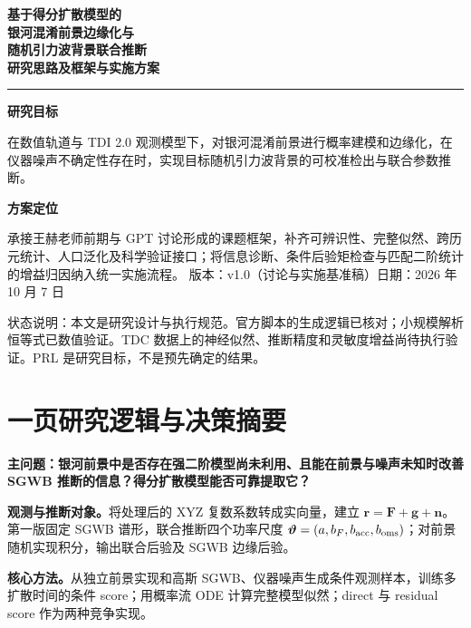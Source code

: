 \documentclass[UTF8,fontset=fandol,a4paper,11pt]{ctexart}
\numberwithin{equation}{section}
\newcommand{\btheta}{\boldsymbol\vartheta}
\newcommand{\br}{\boldsymbol r}
\newcommand{\bF}{\boldsymbol F}
\newcommand{\bn}{\boldsymbol n}
\newcommand{\bg}{\boldsymbol g}
\newcommand{\key}[1]{\par\smallskip\noindent\colorbox{pale}{\parbox{\dimexpr\linewidth-2\fboxsep\relax}{\textbf{#1}}}\par\smallskip}
\begin{document}
\begin{titlepage}
\vspace*{17mm}
\vspace{13mm}
\begin{center}
{\huge\bfseries 基于得分扩散模型的\\[6pt]银河混淆前景边缘化与\\[6pt]随机引力波背景联合推断\\[10pt]研究思路及框架与实施方案\par}
\end{center}
\vspace{12mm}
\noindent\rule{\linewidth}{0.7pt}
\vspace{6mm}
\noindent\textbf{研究目标}\par
在数值轨道与 TDI 2.0 观测模型下，对银河混淆前景进行概率建模和边缘化，在仪器噪声不确定性存在时，实现目标随机引力波背景的可校准检出与联合参数推断。\par
\vspace{5mm}
\noindent\textbf{方案定位}\par
承接王赫老师前期与 GPT 讨论形成的课题框架，补齐可辨识性、完整似然、跨历元统计、人口泛化及科学验证接口；将信息诊断、条件后验矩检查与匹配二阶统计的增益归因纳入统一实施流程。
\vfill
\noindent 版本：v1.0（讨论与实施基准稿）\hfill 日期：2026 年 10 月 7 日\par
\smallskip
\noindent\small 状态说明：本文是研究设计与执行规范。官方脚本的生成逻辑已核对；小规模解析恒等式已数值验证。TDC 数据上的神经似然、推断精度和灵敏度增益尚待执行验证。PRL 是研究目标，不是预先确定的结果。
\end{titlepage}

\section*{一页研究逻辑与决策摘要}
\key{主问题：银河前景中是否存在强二阶模型尚未利用、且能在前景与噪声未知时改善 SGWB 推断的信息？得分扩散模型能否可靠提取它？}
\noindent\textbf{观测与推断对象。}将处理后的 XYZ 复数系数转成实向量，建立 $\br=\bF+\bg+\bn$。第一版固定 SGWB 谱形，联合推断四个功率尺度 $\btheta=(a,b_F,b_{\rm acc},b_{\rm oms})$；对前景随机实现积分，输出联合后验及 SGWB 边缘后验。

\noindent\textbf{核心方法。}从独立前景实现和高斯 SGWB、仪器噪声生成条件观测样本，训练多扩散时间的条件 score；用概率流 ODE 计算完整模型似然；direct 与 residual score 作为两种竞争实现。
\end{document}
